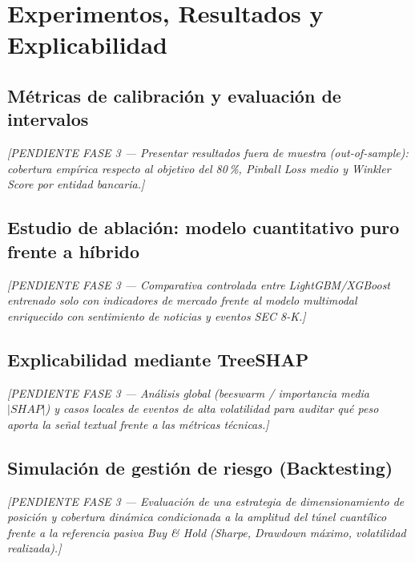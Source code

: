 \chapter{Experimentos, Resultados y Explicabilidad}

\section{Métricas de calibración y evaluación de intervalos}
\textit{[PENDIENTE FASE 3 --- Presentar resultados fuera de muestra (\textit{out-of-sample}): cobertura empírica respecto al objetivo del 80\,\%, \textit{Pinball Loss} medio y \textit{Winkler Score} por entidad bancaria.]}

\section{Estudio de ablación: modelo cuantitativo puro frente a híbrido}
\textit{[PENDIENTE FASE 3 --- Comparativa controlada entre LightGBM/XGBoost entrenado solo con indicadores de mercado frente al modelo multimodal enriquecido con sentimiento de noticias y eventos SEC 8-K.]}

\section{Explicabilidad mediante TreeSHAP}
\textit{[PENDIENTE FASE 3 --- Análisis global (\textit{beeswarm} / importancia media $|SHAP|$) y casos locales de eventos de alta volatilidad para auditar qué peso aporta la señal textual frente a las métricas técnicas.]}

\section{Simulación de gestión de riesgo (Backtesting)}
\textit{[PENDIENTE FASE 3 --- Evaluación de una estrategia de dimensionamiento de posición y cobertura dinámica condicionada a la amplitud del túnel cuantílico frente a la referencia pasiva \textit{Buy \& Hold} (Sharpe, Drawdown máximo, volatilidad realizada).]}
